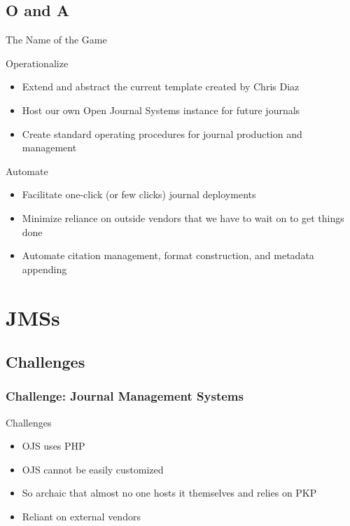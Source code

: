 \documentclass[aspectratio=169,9pt,xcolor=dvipsnames]{beamer}
\begin{document}
\subsection{O and A}
\begin{frame}{The Name of the Game}
    \begin{block}{Operationalize}
        \begin{itemize}
            \item Extend and abstract the current template created by Chris Diaz
            \item Host our own Open Journal Systems instance for future journals
            \item Create standard operating procedures for journal production and management
        \end{itemize}
    \end{block} %
    \begin{block}{Automate}
        \begin{itemize}
            \item Facilitate one-click (or few clicks) journal deployments
            \item Minimize reliance on outside vendors that we have to wait on to get things done
            \item Automate citation management, format construction, and metadata appending
        \end{itemize}
    \end{block} %
    
\end{frame}

\section*{JMSs}
\subsection{Challenges}
\begin{frame}
    \frametitle{Challenge: Journal Management Systems}
    \begin{center}
        \begin{block}{Challenges}
            \begin{itemize}
                \item OJS uses PHP
                \item OJS cannot be easily customized
                \item So archaic that almost no one hosts it themselves and relies on PKP
                \item Reliant on external vendors
            \end{itemize}
            
        \end{block}
    \end{center}
\end{frame}
\end{document}
